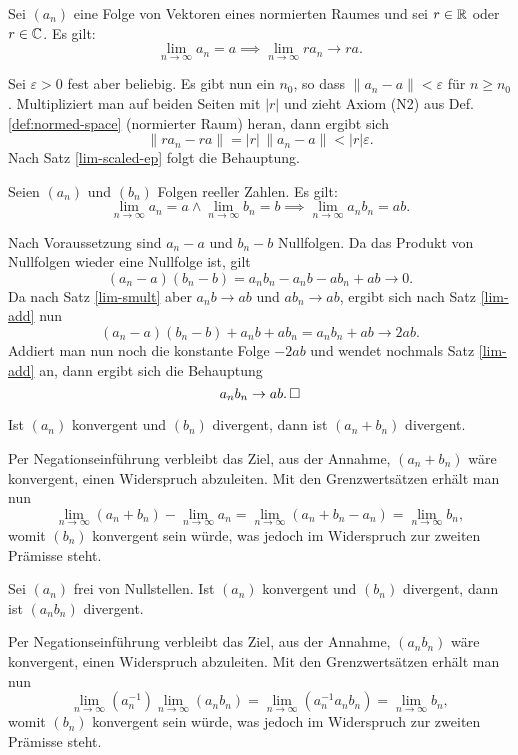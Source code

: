 \begin{Satz}\label{lim-smult}
Sei $(a_n)$ eine Folge von Vektoren eines normierten Raumes
und sei $r\in\mathbb R$ oder $r\in\mathbb C$. Es gilt:
\[\lim_{n\to\infty} a_n = a\implies \lim_{n\to\infty} ra_n\to ra.\]
\end{Satz}

\begin{Beweis}
Sei $\varepsilon>0$ fest aber beliebig. Es gibt nun ein $n_0$, so
dass $\|a_n-a\|<\varepsilon$ für $n\ge n_0$.
Multipliziert man auf beiden Seiten
mit $|r|$ und zieht Axiom (N2) aus
Def. \ref{def:normed-space} (normierter Raum)
heran, dann ergibt sich
\[\|ra_n-ra\| = |r|\,\|a_n-a\|<|r|\varepsilon.\]
Nach Satz \ref{lim-scaled-ep} folgt die Behauptung.\,\qedsymbol
\end{Beweis}

\begin{Satz}\newlinefirst
Seien $(a_n)$ und $(b_n)$ Folgen
reeller Zahlen. Es gilt:
\[\lim_{n\to\infty} a_n=a\land\lim_{n\to\infty} b_n=b\implies
\lim_{n\to\infty} a_n b_n = ab.\]
\end{Satz}

\begin{Beweis}
Nach Voraussetzung sind $a_n-a$ und $b_n-b$ Nullfolgen.
Da das Produkt von Nullfolgen wieder eine Nullfolge ist, gilt
\[(a_n-a)(b_n-b) = a_n b_n-a_n b-ab_n+ab\to 0.\]
Da nach Satz \ref{lim-smult} aber $a_n b\to ab$ und $ab_n\to ab$,
ergibt sich nach Satz \ref{lim-add} nun
\[(a_n-a)(b_n-b)+a_n b+ab_n = a_n b_n+ab\to 2ab.\]
Addiert man nun noch die konstante Folge $-2ab$
und wendet nochmals Satz \ref{lim-add} an, dann ergibt sich
die Behauptung
\[a_n b_n\to ab.\,\square\]
\end{Beweis}

\begin{Satz}
Ist $(a_n)$ konvergent und $(b_n)$ divergent, dann ist
$(a_n+b_n)$ divergent.
\end{Satz}
\begin{Beweis}
Per Negationseinführung verbleibt das Ziel, aus der Annahme,
$(a_n+b_n)$ wäre konvergent, einen Widerspruch abzuleiten.
Mit den Grenzwertsätzen erhält man nun
\[\lim_{n\to\infty} (a_n + b_n) - \lim_{n\to\infty} a_n
= \lim_{n\to\infty} (a_n + b_n - a_n) = \lim_{n\to\infty} b_n,\]
womit $(b_n)$ konvergent sein würde, was jedoch im Widerspruch zur
zweiten Prämisse steht.\,\qedsymbol
\end{Beweis}

\begin{Satz}
Sei $(a_n)$ frei von Nullstellen. Ist $(a_n)$ konvergent und $(b_n)$
divergent, dann ist $(a_n b_n)$ divergent.
\end{Satz}
\begin{Beweis}
Per Negationseinführung verbleibt das Ziel, aus der Annahme,
$(a_n b_n)$ wäre konvergent, einen Widerspruch abzuleiten.
Mit den Grenzwertsätzen erhält man nun
\[\lim_{n\to\infty} (a_n^{-1})\lim_{n\to\infty} (a_n b_n)
= \lim_{n\to\infty} (a_n^{-1} a_n b_n) = \lim_{n\to\infty} b_n,\]
womit $(b_n)$ konvergent sein würde, was jedoch im Widerspruch
zur zweiten Prämisse steht.\,\qedsymbol
\end{Beweis}

